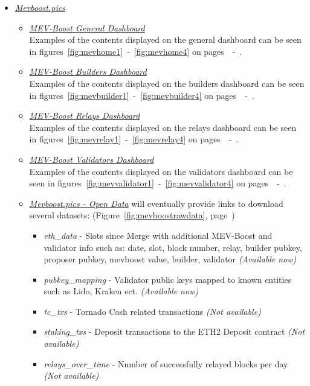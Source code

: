 \documentclass[UTF8]{article}
\begin{document}
\begin{itemize}
	\item \textit{\href{https://mevboost.pics}{Mevboost.pics}} 
	\begin{itemize}
		\item \textit{\href{https://mevboost.pics}{MEV-Boost General Dashboard}}\\
		Examples of the contents displayed on the general dashboard can be seen in figures~\ref{fig:mevhome1}~-~\ref{fig:mevhome4} on pages~\pageref{fig:mevhome1}~-~\pageref{fig:mevhome4}.
		\item \textit{\href{https://mevboost.pics}{MEV-Boost Builders Dashboard}}\\
		Examples of the contents displayed on the builders dashboard can be seen in figures~\ref{fig:mevbuilder1}~-~\ref{fig:mevbuilder4} on pages~\pageref{fig:mevbuilder1}~-~\pageref{fig:mevbuilder4}.
		\item \textit{\href{https://mevboost.pics}{MEV-Boost Relays Dashboard}}\\
		Examples of the contents displayed on the relays dashboard can be seen in figures~\ref{fig:mevrelay1}~-~\ref{fig:mevrelay4} on pages~\pageref{fig:mevrelay1}~-~\pageref{fig:mevrelay4}.
		\item \textit{\href{https://mevboost.pics}{MEV-Boost Validators Dashboard}}\\
		Examples of the contents displayed on the validators dashboard can be seen in figures~\ref{fig:mevvalidator1}~-~\ref{fig:mevvalidator4} on pages~\pageref{fig:mevvalidator1}~-~\pageref{fig:mevvalidator4}.
		\item \textit{\href{https://mevboost.pics/data.html}{Mevboost.pics - Open Data}} will eventually provide links to download several datasets: (Figure~\ref{fig:mevboostrawdata}, page~\pageref{fig:mevboostrawdata})
		\begin{itemize} 
			\item \textit{eth\_data} - Slots since Merge with additional MEV-Boost and validator info such as: date, slot, block number, relay, builder pubkey, proposer pubkey, mevboost value, builder, validator \textit{(Available now)}
			\item \textit{pubkey\_mapping} - Validator public keys mapped to known entities such as Lido, Kraken ect. \textit{(Available now)}
			\item \textit{tc\_txs} - Tornado Cash related transactions \textit{(Not available)}
			\item \textit{staking\_txs} - Deposit transactions to the ETH2 Deposit contract \textit{(Not available)}
			\item \textit{relays\_over\_time} - Number of successfully relayed blocks per day \textit{(Not available)}

\end{itemize}
\end{itemize}
\end{itemize}
\end{document}
